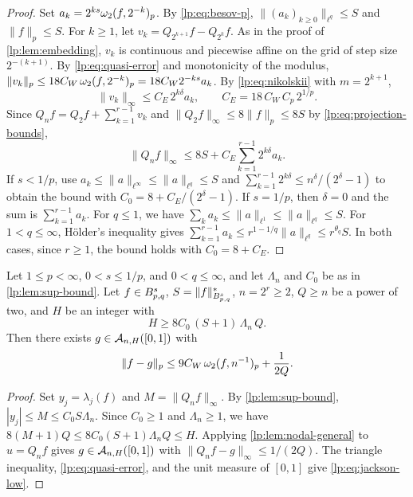 \documentclass[11pt,a4paper]{article}
\begin{document}
\begin{proof}
Set $a_k=2^{ks}\omega_2(f,2^{-k})_{p}$. By \eqref{lp:eq:besov-p}, $\|(a_k)_{k\ge0}\|_{\ell^q}\le S$ and $\|f\|_p\le S$. For $k\ge1$, let $v_k=Q_{2^{k+1}}f-Q_{2^k}f$. As in the proof of \cref{lp:lem:embedding}, $v_k$ is continuous and piecewise affine on the grid of step size $2^{-(k+1)}$. By \eqref{lp:eq:quasi-error} and monotonicity of the modulus, $\|v_k\|_p\le18C_W\,\omega_2(f,2^{-k})_{p}=18C_W2^{-ks}a_k$. By \eqref{lp:eq:nikolskii} with $m=2^{k+1}$,
\[
 \|v_k\|_\infty\le C_E\,2^{k\delta}a_k,\qquad C_E=18\,C_W\,C_p\,2^{1/p}.
\]
Since $Q_nf=Q_2f+\sum_{k=1}^{r-1}v_k$ and $\|Q_2f\|_\infty\le8\|f\|_p\le8S$ by \eqref{lp:eq:projection-bounds},
\[
 \|Q_nf\|_\infty\le8S+C_E\sum_{k=1}^{r-1}2^{k\delta}a_k .
\]
If $s<1/p$, use $a_k\le\|a\|_{\ell^\infty}\le\|a\|_{\ell^q}\le S$ and $\sum_{k=1}^{r-1}2^{k\delta}\le n^\delta/(2^\delta-1)$ to obtain the bound with $C_0=8+C_E/(2^\delta-1)$. If $s=1/p$, then $\delta=0$ and the sum is $\sum_{k=1}^{r-1}a_k$. For $q\le1$, we have $\sum_ka_k\le\|a\|_{\ell^1}\le\|a\|_{\ell^q}\le S$. For $1<q\le\infty$, Hölder's inequality gives $\sum_{k=1}^{r-1}a_k\le r^{1-1/q}\|a\|_{\ell^q}\le r^{\theta_q}S$. In both cases, since $r\ge1$, the bound holds with $C_0=8+C_E$.
\end{proof}

\begin{teorema}
\label{lp:thm:jackson-low}
Let $1\le p<\infty$, $0<s\le1/p$, and $0<q\le\infty$, and let $\Lambda_n$ and $C_0$ be as in \cref{lp:lem:sup-bound}. Let $f\in B^{s}_{p,q}$, $S=\|f\|^*_{B^{s}_{p,q}}$, $n=2^r\ge2$, $Q\ge n$ be a power of two, and $H$ be an integer with
\begin{equation}
 H\ge8C_0\,(S+1)\,\Lambda_n\,Q.
 \label{lp:eq:height-low}
\end{equation}
Then there exists $g\in\mathcal A_{n,H}([0,1])$ with
\begin{equation}
 \|f-g\|_p\le9C_W\,\omega_2(f,n^{-1})_{p}+\frac1{2Q}.
 \label{lp:eq:jackson-low}
\end{equation}
\end{teorema}

\begin{proof}
Set $y_j=\lambda_j(f)$ and $M=\|Q_nf\|_\infty$. By \cref{lp:lem:sup-bound}, $|y_j|\le M\le C_0S\Lambda_n$. Since $C_0\ge1$ and $\Lambda_n\ge1$, we have $8(M+1)Q\le8C_0(S+1)\Lambda_nQ\le H$. Applying \cref{lp:lem:nodal-general} to $u=Q_nf$ gives $g\in\mathcal A_{n,H}([0,1])$ with $\|Q_nf-g\|_\infty\le1/(2Q)$. The triangle inequality, \eqref{lp:eq:quasi-error}, and the unit measure of $[0,1]$ give \eqref{lp:eq:jackson-low}.
\end{proof}
\end{document}
